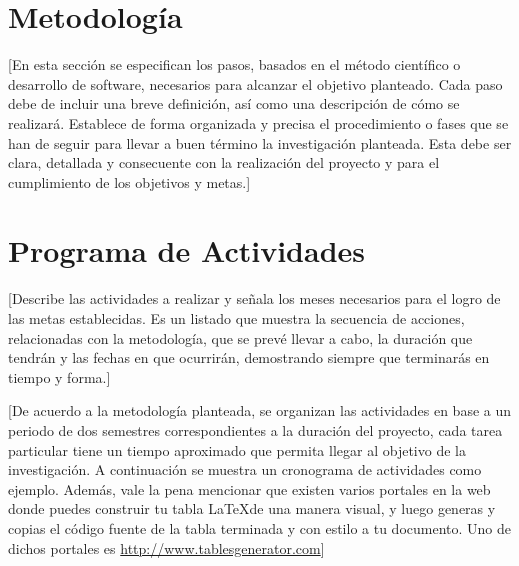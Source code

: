 \documentclass[final,12pt]{article}
\begin{document}
\section{Metodología}
[En esta sección se especifican los pasos, basados en el método científico o desarrollo de software, necesarios para alcanzar el objetivo planteado. 
Cada paso debe de incluir una breve definición, así como una descripción de cómo se realizará.
Establece de forma organizada y precisa el procedimiento o fases que se han de seguir para llevar a buen término la investigación planteada. 
Esta debe ser  clara, detallada y consecuente con la realización del proyecto y para el cumplimiento de los objetivos y metas.]



\section{Programa de Actividades}

[Describe las actividades a realizar y señala los meses necesarios para el logro de las metas establecidas.
Es un listado que muestra la secuencia de acciones, relacionadas con la metodología, que se prevé llevar a cabo, la duración que tendrán y las fechas en que ocurrirán, demostrando siempre que terminarás en tiempo y forma.]


[De acuerdo a la metodología planteada, se organizan las actividades en base a un periodo de dos semestres correspondientes a la duración del proyecto, cada tarea particular tiene un tiempo aproximado que permita llegar al objetivo de la investigación.
A continuación se muestra un cronograma de actividades como ejemplo. 
Además, vale la pena mencionar que existen varios portales en la web donde puedes construir tu tabla \LaTeX de una manera visual, y luego generas y copias el código fuente de la tabla terminada y con estilo a tu documento. Uno de dichos portales es \url{http://www.tablesgenerator.com}]
\end{document}
